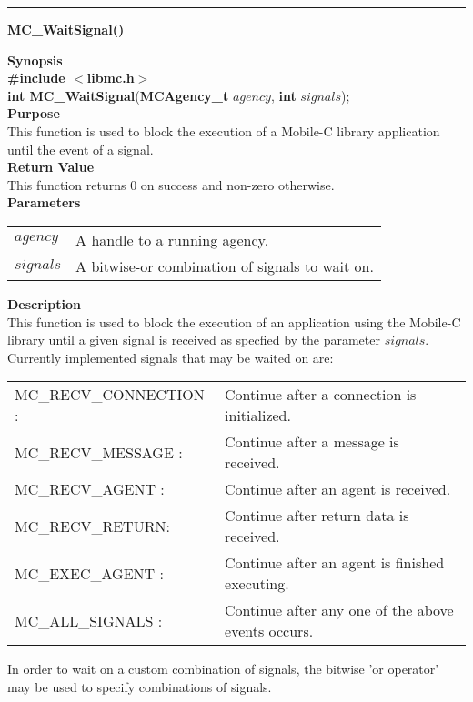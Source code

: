\noindent
\vspace{5pt}
\rule{6.5in}{0.015in}
\noindent
{\LARGE \bf MC\_WaitSignal()}\\
{}

\noindent
{\bf Synopsis}\\
{\bf \#include $<$libmc.h$>$}\\
{\bf int MC\_WaitSignal}({\bf MCAgency\_t} $agency$, {\bf int} $signals$);\\

\noindent
{\bf Purpose}\\
This function is used to block the execution of a Mobile-C library application 
until the event of a signal.\\

\noindent
{\bf Return Value}\\
This function returns 0 on success and non-zero otherwise.\\

\noindent
{\bf Parameters}
\vspace{-0.1pt}
\begin{description}
\item
\begin{tabular}{p{10 mm}p{145 mm}}
$agency$ & A handle to a running agency.\\
$signals$ & A bitwise-or combination of signals to wait on.
\end{tabular}
\end{description}

\noindent
{\bf Description}\\
This function is used to block the execution of an application using the 
Mobile-C library until a given signal is received as specfied by the 
parameter $signals$. 
Currently implemented signals that may be waited on are:
\vspace{-0.1in}
\begin{description}
\item               
\begin{tabular}{p{50 mm}p{120 mm}}
MC\_RECV\_CONNECTION : & Continue after a connection is initialized.\\
MC\_RECV\_MESSAGE : & Continue after a message is received.\\
MC\_RECV\_AGENT : & Continue after an agent is received.\\
MC\_RECV\_RETURN: & Continue after return data is received.\\
MC\_EXEC\_AGENT : & Continue after an agent is finished executing.\\
MC\_ALL\_SIGNALS : & Continue after any one of the above events occurs. 
\end{tabular}
\end{description}
In order to wait on a custom combination of signals, the bitwise 'or operator' 
may be used to specify combinations of signals.\\ 

